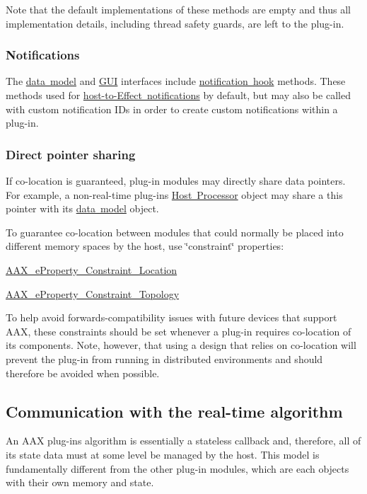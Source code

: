 Note that the default implementations of these methods are empty and thus all implementation details, including thread safety guards, are left to the plug-\/in.\hypertarget{a00800_CommonInterface_Communication_hostmodules_notifications}{}\subsubsection{Notifications}\label{a00800_CommonInterface_Communication_hostmodules_notifications}
The \mbox{\hyperlink{a00798}{data model}} and \mbox{\hyperlink{a00799}{G\+UI}} interfaces include \mbox{\hyperlink{a01669_aa3eaeb292d2ca84086a5a058171994fd}{notification hook}} methods. These methods used for \mbox{\hyperlink{a00491_afab5ea2cfd731fc8f163b6caa685406e}{host-\/to-\/\+Effect notifications}} by default, but may also be called with custom notification I\+Ds in order to create custom notifications within a plug-\/in.\hypertarget{a00800_CommonInterface_Communication_hostmodules_directpointersharing}{}\subsubsection{Direct pointer sharing}\label{a00800_CommonInterface_Communication_hostmodules_directpointersharing}
If co-\/location is guaranteed, plug-\/in modules may directly share data pointers. For example, a non-\/real-\/time plug-\/in\textquotesingle{}s \mbox{\hyperlink{a00804}{Host Processor}} object may share a {\ttfamily this} pointer with its \mbox{\hyperlink{a00798}{data model}} object.

To guarantee co-\/location between modules that could normally be placed into different memory spaces by the host, use \char`\"{}constraint\char`\"{} properties\+:

\begin{DoxyItemize}
\item \mbox{\hyperlink{a00662_a13e384f22825afd3db6d68395b79ce0da79a0815fea6c8f1a0d8ed511aa88e9ff}{A\+A\+X\+\_\+e\+Property\+\_\+\+Constraint\+\_\+\+Location}} \item \mbox{\hyperlink{a00662_a13e384f22825afd3db6d68395b79ce0da5d7fca796aba48b5dc364af0cc633a02}{A\+A\+X\+\_\+e\+Property\+\_\+\+Constraint\+\_\+\+Topology}}\end{DoxyItemize}
To help avoid forwards-\/compatibility issues with future devices that support A\+AX, these constraints should be set whenever a plug-\/in requires co-\/location of its components. Note, however, that using a design that relies on co-\/location will prevent the plug-\/in from running in distributed environments and should therefore be avoided when possible.\hypertarget{a00800_CommonInterface_Communication_algorithm}{}\subsection{Communication with the real-\/time algorithm}\label{a00800_CommonInterface_Communication_algorithm}
An A\+AX plug-\/in\textquotesingle{}s algorithm is essentially a stateless callback and, therefore, all of its state data must at some level be managed by the host. This model is fundamentally different from the other plug-\/in modules, which are each objects with their own memory and state.


